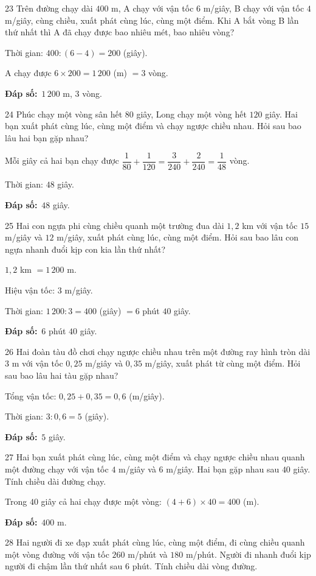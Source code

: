 \documentclass[11pt]{article}
\newif\ifsol \solfalse
\providecommand{\AnsWord}{Đáp số}
\newcommand{\dapso}[1]{\par\textbf{\AnsWord:}\ #1}
\newcommand{\probsol}[1]{%
  \begin{lrbox}{\solmeasure}\begin{minipage}{\dimexpr\linewidth-24pt\relax}#1\end{minipage}\end{lrbox}%
  \ifsol
    \begin{solbox}#1\end{solbox}%
  \else
    \setlength{\solht}{\dimexpr\ht\solmeasure+\dp\solmeasure+0.85cm\relax}%
    \ifdim\solht<1.35cm\setlength{\solht}{1.35cm}\fi
    \begin{tcolorbox}[colback=white,colframe=Line,boxrule=0.8pt,arc=5pt,
      left=8pt,right=8pt,top=4pt,bottom=4pt,height=\solht]{\footnotesize\color{Slate}\itshape\WorkWord}\end{tcolorbox}%
  \fi}
\newcommand{\gap}{\vspace{0.3cm}}
\def\WorkWord{Bài làm:}
\def\AnsWord{Đáp số}
\begin{document}
\gap
\begin{probbox}{23}{\relax}
Trên đường chạy dài $400$ m, A chạy với vận tốc $6$ m/giây, B chạy với vận tốc $4$ m/giây, cùng chiều, xuất phát cùng lúc, cùng một điểm. Khi A bắt vòng B lần thứ nhất thì A đã chạy được bao nhiêu mét, bao nhiêu vòng?
\end{probbox}
\probsol{
Thời gian: $400:(6-4)=200$ (giây).\par A chạy được $6\times200=1\,200$ (m) $=3$ vòng.
\dapso{$1\,200$ m, $3$ vòng.}}
\gap
\begin{probbox}{24}{\relax}
Phúc chạy một vòng sân hết $80$ giây, Long chạy một vòng hết $120$ giây. Hai bạn xuất phát cùng lúc, cùng một điểm và chạy ngược chiều nhau. Hỏi sau bao lâu hai bạn gặp nhau?
\end{probbox}
\probsol{
Mỗi giây cả hai bạn chạy được $\dfrac1{80}+\dfrac1{120}=\dfrac3{240}+\dfrac2{240}=\dfrac1{48}$ vòng.\par Thời gian: $48$ giây.
\dapso{$48$ giây.}}
\gap
\begin{probbox}{25}{\relax}
Hai con ngựa phi cùng chiều quanh một trường đua dài $1{,}2$ km với vận tốc $15$ m/giây và $12$ m/giây, xuất phát cùng lúc, cùng một điểm. Hỏi sau bao lâu con ngựa nhanh đuổi kịp con kia lần thứ nhất?
\end{probbox}
\probsol{
$1{,}2$ km $=1\,200$ m.\par Hiệu vận tốc: $3$ m/giây.\par Thời gian: $1\,200:3=400$ (giây) $=6$ phút $40$ giây.
\dapso{$6$ phút $40$ giây.}}
\gap
\begin{probbox}{26}{\relax}
Hai đoàn tàu đồ chơi chạy ngược chiều nhau trên một đường ray hình tròn dài $3$ m với vận tốc $0{,}25$ m/giây và $0{,}35$ m/giây, xuất phát từ cùng một điểm. Hỏi sau bao lâu hai tàu gặp nhau?
\end{probbox}
\probsol{
Tổng vận tốc: $0{,}25+0{,}35=0{,}6$ (m/giây).\par Thời gian: $3:0{,}6=5$ (giây).
\dapso{$5$ giây.}}
\gap
\begin{probbox}{27}{\relax}
Hai bạn xuất phát cùng lúc, cùng một điểm và chạy ngược chiều nhau quanh một đường chạy với vận tốc $4$ m/giây và $6$ m/giây. Hai bạn gặp nhau sau $40$ giây. Tính chiều dài đường chạy.
\end{probbox}
\probsol{
Trong $40$ giây cả hai chạy được một vòng: $(4+6)\times40=400$ (m).
\dapso{$400$ m.}}
\gap
\begin{probbox}{28}{\relax}
Hai người đi xe đạp xuất phát cùng lúc, cùng một điểm, đi cùng chiều quanh một vòng đường với vận tốc $260$ m/phút và $180$ m/phút. Người đi nhanh đuổi kịp người đi chậm lần thứ nhất sau $6$ phút. Tính chiều dài vòng đường.
\end{probbox}
\end{document}
